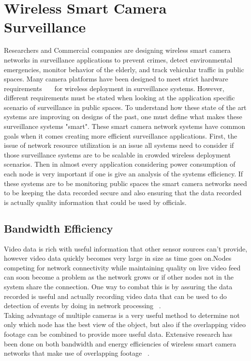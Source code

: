 \documentclass[journal,transmag]{IEEEtran}
\begin{document}
\section{Wireless Smart Camera Surveillance}
Researchers and Commercial companies are designing wireless smart camera networks in surveillance applications to prevent crimes, detect environmental emergencies,
monitor behavior of the elderly, and track vehicular traffic in public spaces. Many camera platforms have been designed to meet strict hardware requirements~\cite{Flexi-WVSNP}~\cite{Citric}~\cite{WiFLIP} for wireless deployment in surveillance systems. However, different requirements must be stated when looking at the application specific 
scenario of surveillance in public spaces. To understand how these state of the art systems are improving on designs of the past, one must define what makes these
surveillance systems "smart". These smart camera network systems have common goals when it comes creating more efficient surveillance applications. First, the issue 
of network resource utilization is an issue all systems need to consider if those surveillance systems are to be scalable in crowded wireless deployment 
scenarios. Then in almost every application considering power consumption of each node is very important if one is give an analysis of the systems 
efficiency. If these systems are to be monitoring public spaces the smart camera networks need to be keeping the data recorded secure and also
ensuring that the data recorded is actually quality information that could be used by officials. 

\subsection{Bandwidth Efficiency}
Video data is rich with useful information that other sensor sources can’t provide, however video data quickly becomes very large in size as time goes 
on.Nodes competing for network connectivity while maintaining quality on live video feed can soon become a problem as the network grows or if other 
nodes not in the system share the connection. One way to combat this is by assuring the data recorded is useful and actually recording video data that 
can be used to do detection of events by doing in network processing ~\cite{Citric}.\\

Taking advantage of multiple cameras is a very useful method to determine not only which node has the best view of the object, but also if the overlapping
video footage can be combined to provide more useful data. Extensive research has been done on both bandwidth and energy efficiencies of wireless
smart camera networks that make use of overlapping footage ~\cite{AccLatEnergy}.
\end{document}

